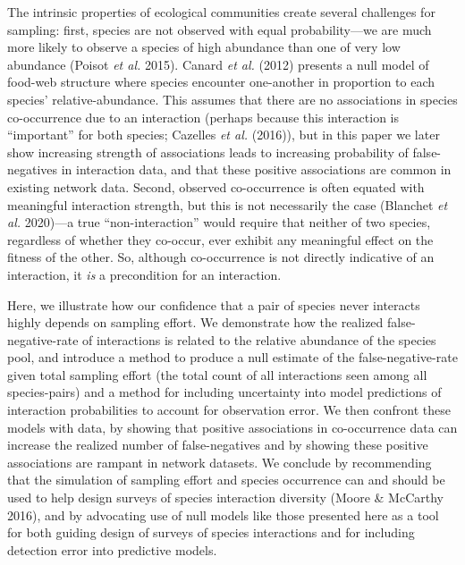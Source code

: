 \documentclass[11pt]{article}
\begin{document}
The intrinsic properties of ecological communities create several
challenges for sampling: first, species are not observed with equal
probability---we are much more likely to observe a species of high
abundance than one of very low abundance (Poisot \emph{et al.} 2015).
Canard \emph{et al.} (2012) presents a null model of food-web structure
where species encounter one-another in proportion to each species'
relative-abundance. This assumes that there are no associations in
species co-occurrence due to an interaction (perhaps because this
interaction is ``important'' for both species; Cazelles \emph{et al.}
(2016)), but in this paper we later show increasing strength of
associations leads to increasing probability of false-negatives in
interaction data, and that these positive associations are common in
existing network data. Second, observed co-occurrence is often equated
with meaningful interaction strength, but this is not necessarily the
case (Blanchet \emph{et al.} 2020)---a true ``non-interaction'' would
require that neither of two species, regardless of whether they
co-occur, ever exhibit any meaningful effect on the fitness of the
other. So, although co-occurrence is not directly indicative of an
interaction, it \emph{is} a precondition for an interaction.

Here, we illustrate how our confidence that a pair of species never
interacts highly depends on sampling effort. We demonstrate how the
realized false-negative-rate of interactions is related to the relative
abundance of the species pool, and introduce a method to produce a null
estimate of the false-negative-rate given total sampling effort (the
total count of all interactions seen among all species-pairs) and a
method for including uncertainty into model predictions of interaction
probabilities to account for observation error. We then confront these
models with data, by showing that positive associations in co-occurrence
data can increase the realized number of false-negatives and by showing
these positive associations are rampant in network datasets. We conclude
by recommending that the simulation of sampling effort and species
occurrence can and should be used to help design surveys of species
interaction diversity (Moore \& McCarthy 2016), and by advocating use of
null models like those presented here as a tool for both guiding design
of surveys of species interactions and for including detection error
into predictive models.
\end{document}
